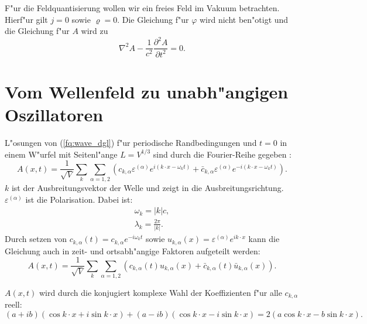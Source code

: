 \begin{refsection}
F"ur die Feldquantisierung wollen wir ein freies Feld im Vakuum betrachten. Hierf"ur gilt $j = 0$ sowie $\varrho = 0$.
Die Gleichung f"ur $\varphi$ wird nicht ben"otigt und die Gleichung f"ur $A$ wird zu
\begin{equation} \label{fq:wave_dgl}
\nabla^2 A - \frac{1}{c^2} \frac{\partial^2 A }{\partial t^2} = 0.
\end{equation}

\section{Vom Wellenfeld zu unabh"angigen Oszillatoren}

L"osungen von (\ref{fq:wave_dgl}) f"ur periodische Randbedingungen und $t=0$ in einem W"urfel mit Seitenl"ange $L = V^{1/3}$ sind durch die Fourier-Reihe gegeben \cite{fq:em_wave_eq}:
\begin{equation} \label{fq:wave_eq}
A(x,t) = \frac{1}{\sqrt{V}} \sum_k \sum_{\alpha=1,2} \left(c_{k,\alpha} \varepsilon^{(\alpha)} e^{i (k \cdot x - \omega_k t)} + \bar{c}_{k,\alpha} \varepsilon^{(\alpha)} e^{-i(k \cdot x - \omega_k t)}\right).
\end{equation}
$k$ ist der Ausbreitungsvektor der Welle und zeigt in die Ausbreitungsrichtung. $\varepsilon^{(\alpha)}$ ist die Polarisation. Dabei ist:
\begin{align*}
\omega_k=|k|c, \\
\lambda_k = \frac{2 \pi}{|k|}.
\end{align*}
Durch setzen von $c_{k,\alpha}(t) = c_{k,\alpha} e^{-i \omega_k t}$ sowie $u_{k,\alpha}(x) = \varepsilon^{(\alpha)} e^{ik \cdot x}$ kann die Gleichung auch in zeit- und ortsabh"angige Faktoren aufgeteilt werden:
\begin{equation*}
A(x,t) = \frac{1}{\sqrt{V}} \sum_k \sum_{\alpha=1,2} \left(c_{k,\alpha}(t)u_{k,\alpha}(x) + \bar{c}_{k,\alpha}(t) \bar{u}_{k,\alpha}(x) \right).
\end{equation*}

$A(x,t)$ wird durch die konjugiert komplexe Wahl der Koeffizienten f"ur alle $c_{k,\alpha}$ reell:
\begin{equation*}
(a + ib)(\cos k \cdot x + i \sin k \cdot x ) + (a - ib)(\cos k \cdot x - i \sin k \cdot x ) = 2 ( a \cos k \cdot x - b \sin k \cdot x ).
\end{equation*}


\end{refsection}

